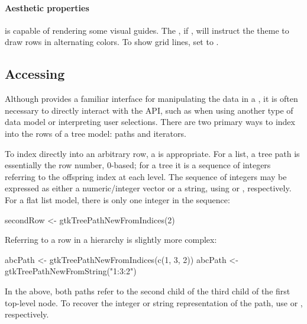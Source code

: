 \paragraph{Aesthetic properties}

 is capable of rendering some visual guides. The
, if , will instruct the theme to draw
rows in alternating colors. To show grid lines, set
 to .

\subsection{Accessing }
\label{sec:RGtk2:mvc:iterators}

Although  provides a familiar interface for
manipulating the data in a , it is often necessary
to directly interact with the \GTK\/ API, such as when using another
type of data model or interpreting user selections. There are two
primary ways to index into the rows of a tree model: paths and
iterators.

To index directly into an arbitrary row, a  is
appropriate. For a list, a tree path is essentially the row number,
$0$-based; for a tree it is a sequence of integers referring to the
offspring index at each level. The sequence of integers may be
expressed as either a numeric/integer vector or a string, using
 or
, respectively. For a flat list
model, there is only one integer in the sequence:
\begin{Schunk}
\begin{Sinput}
 secondRow <- gtkTreePathNewFromIndices(2)
\end{Sinput}
\end{Schunk}
Referring to a row in a hierarchy is slightly more complex:
\begin{Schunk}
\begin{Sinput}
 abcPath <- gtkTreePathNewFromIndices(c(1, 3, 2))
 abcPath <- gtkTreePathNewFromString("1:3:2")
\end{Sinput}
\end{Schunk}
In the above, both paths refer to the second child of the third child
of the first top-level node. To recover the integer or string
representation of the path, use  or
, respectively.


